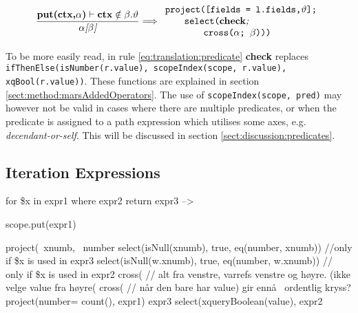 \begin{equation}
\centering
	\frac{\displaystyle \textbf{put(ctx,}\alpha\textbf{)}\vdash
	\textbf{ctx}\notin\beta . \vartheta}{\alpha \textit{[}\beta\textit{]}}
	\Longrightarrow 
	\begin{array}{l}
		\mbox{\texttt{project([fields = l.fields,}} \vartheta \mbox{\texttt{];}} 
		\\ \qquad \mbox{\texttt{select(}\textbf{check}\textit{;}} \\ \qquad \qquad
		\mbox{\texttt{cross(}} 
		\alpha \texttt{; }
		\beta \mbox{\texttt{)))}}
	\end{array}
\label{eq:translation:predicate}
\end{equation}


To be more easily read, in rule \ref{eq:translation:predicate} \textbf{check}
replaces \texttt{ifThenElse(isNumber(r.value), scopeIndex(scope, r.value),
xqBool(r.value))}. These functions are explained in section
\ref{sect:method:marsAddedOperators}. The use of \texttt{scopeIndex(scope,
pred)} may however not be valid in cases where there are multiple predicates,
or when the predicate is assigned to a path expression which utilises some
axes, e.g. \textit{decendant-or-self}. This will be discussed in section
\ref{sect:discussion:predicates}.


\subsection{Iteration Expressions}
\label{sect:translation:iteration}

for \$x in expr1 where expr2 return expr3  -->

scope.put(expr1)

project(~xnumb, ~number
    select(isNull(xnumb), true, eq(number, xnumb))             
    //only if \$x is  used in expr3 
    select(isNull(w.xnumb), true, eq(number, w.xnumb))         
    // only if \$x is used in expr2 
        cross(                     
    // alt fra venstre, varrefs venstre og høyre. (ikke velge value fra h\o yre(
            cross(                                             
          //  n\aa r den bare har value) gir enn\aa~ ordentlig kryss?
                project(number= count(), 
                    expr1)
                expr3
        select(xqueryBoolean(value),                                  
            expr2

